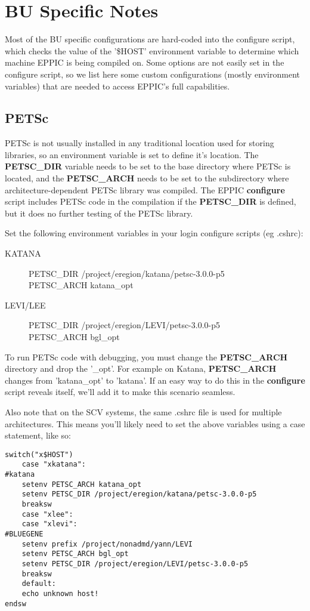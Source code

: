 

\chapter{BU Specific Notes}

Most of the BU specific configurations are hard-coded into the
configure script, which checks the value of the '\$HOST' environment
variable to determine which machine EPPIC is being compiled on. Some
options are not easily set in the configure script, so we list here
some custom configurations (mostly environment variables) that are
needed to access EPPIC's full capabilities. 

\section{PETSc}

PETSc is not usually installed in any traditional location used for
storing libraries, so an environment variable is set to define it's
location. The \textbf{PETSC\_DIR} variable needs to be set to the base
directory where PETSc is located, and the \textbf{PETSC\_ARCH} needs to
be set to the subdirectory where architecture-dependent PETSc library
was compiled. The EPPIC \textbf{configure} script includes PETSc code in
the compilation if the \textbf{PETSC\_DIR} is defined, but it does no
further testing of the PETSc library.

Set the following environment variables in your login configure scripts
(eg .cshrc):
\begin{description}
\item[KATANA] 
  PETSC\_DIR /project/eregion/katana/petsc-3.0.0-p5\\
  PETSC\_ARCH katana\_opt
\item[LEVI/LEE] PETSC\_DIR /project/eregion/LEVI/petsc-3.0.0-p5\\
  PETSC\_ARCH bgl\_opt
\end{description}

 To run PETSc code with debugging, you
must change the \textbf{PETSC\_ARCH} directory and drop the
'\_opt'. For example on Katana, \textbf{PETSC\_ARCH} changes from 'katana\_opt'
to 'katana'. If an easy way to do this in the \textbf{configure}
script reveals itself, we'll add it to make this scenario seamless.

Also note that on the SCV systems, the same .cshrc file is used for
multiple architectures. This means you'll likely need to set the above
variables using a case statement, like so:
\begin{lstlisting}[language=CSH]
switch("x$HOST")
    case "xkatana":
#katana
    setenv PETSC_ARCH katana_opt
    setenv PETSC_DIR /project/eregion/katana/petsc-3.0.0-p5
    breaksw
    case "xlee":
    case "xlevi":
#BLUEGENE
    setenv prefix /project/nonadmd/yann/LEVI
    setenv PETSC_ARCH bgl_opt
    setenv PETSC_DIR /project/eregion/LEVI/petsc-3.0.0-p5
    breaksw
    default:
    echo unknown host!
endsw
\end{lstlisting}


 

